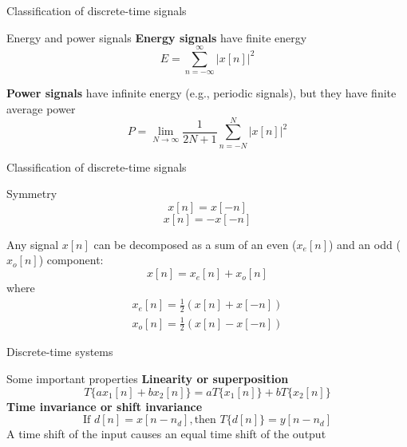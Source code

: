\documentclass[10pt, handout]{beamer}
\begin{document}
%
\begin{frame}{Classification of discrete-time signals}
\begin{block}{Energy and power signals}
	\textbf{Energy signals} have finite energy
	\begin{equation*}
		E = \sum_{n=-\infty}^{\infty} |x[n]|^2
	\end{equation*}
	
	\textbf{Power signals} have infinite energy (e.g., periodic signals), but they have finite average power
	\begin{equation*}
		P = \lim_{N\to\infty}\frac{1}{2N+1}\sum_{n=-N}^{N} |x[n]|^2
	\end{equation*}	
\end{block}	
\end{frame}

%
\begin{frame}{Classification of discrete-time signals}
\begin{block}{Symmetry}
	\begin{equation*}
	x[n] = x[-n] \tag{even symmetry}
	\end{equation*}
	\begin{equation*}
	x[n] = -x[-n] \tag{odd symmetry}
	\end{equation*}
	
	Any signal $x[n]$ can be decomposed as a sum of an even ($x_e[n]$) and an odd ($x_o[n]$) component:
	\begin{equation*}
	x[n] = x_e[n] + x_o[n]
	\end{equation*}	
	where 
	\begin{align}
	x_e[n] = \frac{1}{2}(x[n] + x[-n]) \tag{even component} \\
	x_o[n] = \frac{1}{2}(x[n] - x[-n]) \tag{odd component}
	\end{align}
\end{block}	
\end{frame}

%
\begin{frame}{Discrete-time systems}

\begin{figure}
	\centering
	\resizebox{0.9\linewidth}{!}{}
	\label{fig:DTsystem}
\end{figure}

\begin{block}{Some important properties}
	\textbf{Linearity or superposition}
	\begin{equation*}
	T\{ax_1[n] + bx_2[n]\} = aT\{x_1[n]\} + bT\{x_2[n]\}
	\end{equation*}
	\textbf{Time invariance or shift invariance}
	\begin{equation*}
	\text{If } d[n] = x[n-n_d], \text{then } T\{d[n]\} = y[n-n_d]
	\end{equation*}
	A time shift of the input causes an equal time shift of the output
\end{block}
\end{frame}
\end{document}

